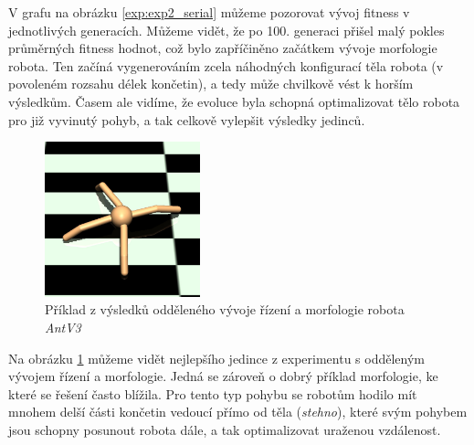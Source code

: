 V grafu na obrázku \ref{exp:exp2_serial} můžeme pozorovat vývoj fitness v
jednotlivých generacích. Můžeme vidět, že po 100. generaci přišel malý pokles
průměrných fitness hodnot, což bylo zapříčiněno začátkem vývoje morfologie
robota. Ten začíná vygenerováním zcela náhodných konfigurací těla robota (v
povoleném rozsahu délek končetin), a tedy může chvilkově vést k horším
výsledkům. Časem ale vidíme, že evoluce byla schopná optimalizovat tělo robota
pro již vyvinutý pohyb, a tak celkově vylepšit výsledky jedinců.

\begin{figure}[h!]
    \centering
    \includegraphics[width=0.4\textwidth]{../img/crop_exp2_serial_top1.jpg}
    \caption{Příklad z výsledků odděleného vývoje řízení a morfologie robota
    \emph{AntV3}}
    \label{fig:exp2_serial_body_show}
\end{figure}

Na obrázku \ref{fig:exp2_serial_body_show} můžeme vidět nejlepšího jedince z
experimentu s odděleným vývojem řízení a morfologie. Jedná se zároveň o dobrý
příklad morfologie, ke které se řešení často blížila. Pro tento typ pohybu se 
robotům hodilo mít mnohem delší části končetin vedoucí přímo od těla
(\emph{stehno}), které svým pohybem jsou schopny posunout robota dále, a tak
optimalizovat uraženou vzdálenost.
